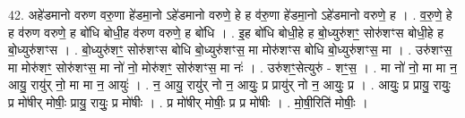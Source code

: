 \documentclass[17pt]{extarticle}
\begin{document}
42. अहे॑डमानो वरुण वरु॒णा हे॑डमा॒नो ऽहे॑डमानो वरुणे॒ हे ह व॑रु॒णा हे॑डमा॒नो ऽहे॑डमानो वरुणे॒ ह । . व॒रु॒णे॒ हे ह व॑रुण वरुणे॒ ह बो॑धि बोधी॒ह व॑रुण वरुणे॒ ह बो॑धि । . इ॒ह बो॑धि बोधी॒हे ह बो॒ध्युरु॑शꣳ॒॒ सोरु॑शꣳस बोधी॒हे ह बो॒ध्युरु॑शꣳस । . बो॒ध्युरु॑शꣳ॒॒ सोरु॑शꣳस बोधि बो॒ध्युरु॑शꣳस॒ मा मोरु॑शꣳस बोधि बो॒ध्युरु॑शꣳस॒ मा । . उरु॑शꣳस॒ मा मोरु॑शꣳ॒॒ सोरु॑शꣳस॒ मा नो॑ नो॒ मोरु॑शꣳ॒॒ सोरु॑शꣳस॒ मा नः॑ । . उरु॑शꣳ॒॒सेत्युरु॑ - शꣳ॒॒स॒ । . मा नो॑ नो॒ मा मा न॒ आयु॒ रायु॑र् नो॒ मा मा न॒ आयुः॑ । . न॒ आयु॒ रायु॑र् नो न॒ आयुः॒ प्र प्रायु॑र् नो न॒ आयुः॒ प्र । . आयुः॒ प्र प्रायु॒ रायुः॒ प्र मो॑षीर् मोषीः॒ प्रायु॒ रायुः॒ प्र मो॑षीः । . प्र मो॑षीर् मोषीः॒ प्र प्र मो॑षीः । . मो॒षी॒रिति॑ मोषीः॒ । \newline
\pagebreak
\end{document}
